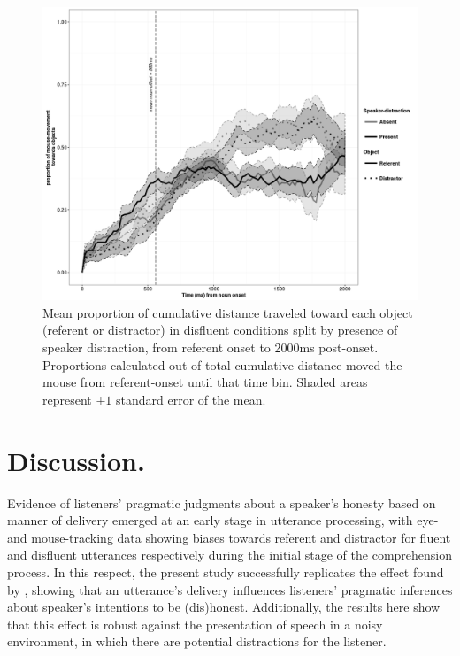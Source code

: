 \documentclass[a4paper,man,natbib]{apa6}
\begin{document}
\begin{figure}[Ht]
  \centering
	\includegraphics[scale=.5]{mdisfl.png}
  \caption{Mean proportion of cumulative distance traveled toward each object (referent or distractor) in disfluent conditions split by presence of speaker distraction, from referent onset to 2000ms post-onset. Proportions calculated out of total cumulative distance moved the mouse from referent-onset until that time bin. Shaded areas represent $\pm 1$ standard error of the mean.}
  \label{fig:mdis}
\end{figure}




\section{Discussion.}

Evidence of listeners' pragmatic judgments about a speaker's honesty based on manner of delivery emerged at an early stage in utterance processing, with eye- and mouse-tracking data showing biases towards referent and distractor for fluent and disfluent utterances respectively during the initial stage of the comprehension process. 
In this respect, the present study successfully replicates the effect found by \citet{Loy2016}, showing that an utterance's delivery influences listeners' pragmatic inferences about speaker's intentions to be (dis)honest. 
Additionally, the results here show that this effect is robust against the presentation of speech in a noisy environment, in which there are potential distractions for the listener. 
\\
\end{document}
